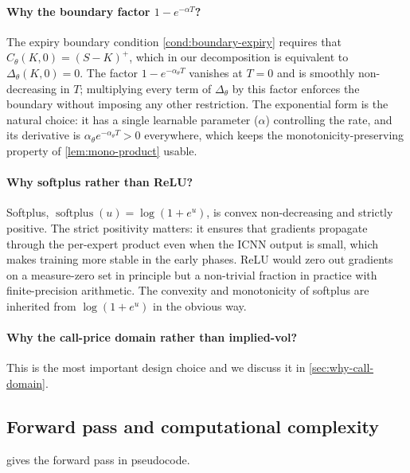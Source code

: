 \documentclass[largeformat]{interact}
\theoremstyle{plain}
\theoremstyle{definition}
\DeclareMathOperator{\softplus}{softplus}
\begin{document}
\paragraph{Why the boundary factor $1 - e^{-\alpha T}$?}
The expiry boundary condition \ref{cond:boundary-expiry} requires that $C_\theta(K, 0) = (S - K)^+$, which in our decomposition is equivalent to $\Delta_\theta(K, 0) = 0$. The factor $1 - e^{-\alpha_\theta T}$ vanishes at $T = 0$ and is smoothly non-decreasing in $T$; multiplying every term of $\Delta_\theta$ by this factor enforces the boundary without imposing any other restriction. The exponential form is the natural choice: it has a single learnable parameter ($\alpha$) controlling the rate, and its derivative is $\alpha_\theta e^{-\alpha_\theta T} > 0$ everywhere, which keeps the monotonicity-preserving property of \cref{lem:mono-product} usable.

\paragraph{Why softplus rather than ReLU?}
Softplus, $\softplus(u) = \log(1 + e^u)$, is convex non-decreasing and strictly positive. The strict positivity matters: it ensures that gradients propagate through the per-expert product even when the ICNN output is small, which makes training more stable in the early phases. ReLU would zero out gradients on a measure-zero set in principle but a non-trivial fraction in practice with finite-precision arithmetic. The convexity and monotonicity of softplus are inherited from $\log(1 + e^u)$ in the obvious way.

\paragraph{Why the call-price domain rather than implied-vol?}
This is the most important design choice and we discuss it in \cref{sec:why-call-domain}.

\subsection{Forward pass and computational complexity}

 gives the forward pass in pseudocode.
\end{document}
